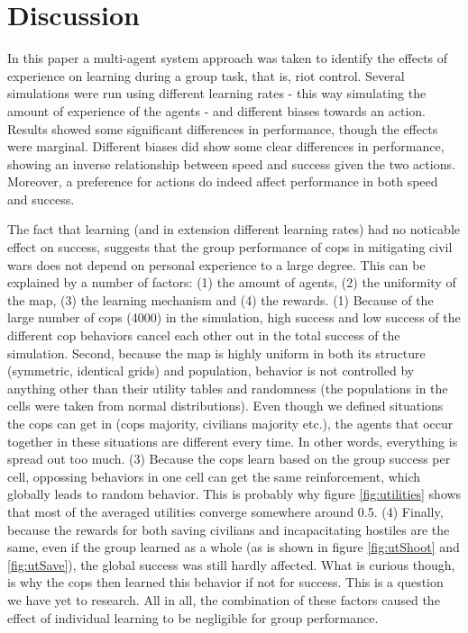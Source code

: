 \section{Discussion}
In this paper a multi-agent system approach was taken to identify the effects of experience on learning during a group task, that is, riot control. Several simulations were run using different learning rates - this way simulating the amount of experience of the agents - and different biases towards an action. Results showed some significant differences in performance, though the effects were marginal. Different biases did show some clear differences in performance, showing an inverse relationship between speed and success given the two actions. Moreover, a preference for actions do indeed affect performance in both speed and success. 

The fact that learning (and in extension different learning rates) had no noticable effect on success, suggests that the group performance of cops in mitigating civil wars does not depend on personal experience to a large degree. This can be explained by a number of factors: (1) the amount of agents, (2) the uniformity of the map, (3) the learning mechanism and (4) the rewards. (1) Because of the large number of cops (4000) in the simulation, high success and low success of the different cop behaviors cancel each other out in the total success of the simulation. Second, because the map is highly uniform in both its structure (symmetric, identical grids) and population, behavior is not controlled by anything other than their utility tables and randomness (the populations in the cells were taken from normal distributions). Even though we defined situations the cops can get in (cops majority, civilians majority etc.), the agents that occur together in these situations are different every time. In other words, everything is spread out too much. (3) Because the cops learn based on the group success per cell, oppossing behaviors in one cell can get the same reinforcement, which globally leads to random behavior. This is probably why figure \ref{fig:utilities} shows that most of the averaged utilities converge somewhere around 0.5. (4) Finally, because the rewards for both saving civilians and incapacitating hostiles are the same, even if the group learned as a whole (as is shown in figure \ref{fig:utShoot} and \ref{fig:utSave}), the global success was still hardly affected. What is curious though, is why the cops then learned this behavior if not for success. This is a question we have yet to research.
All in all, the combination of these factors caused the effect of individual learning to be negligible for group performance.

